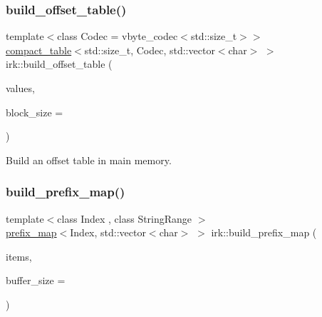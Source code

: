 \mbox{\label{namespaceirk_af80eeaf7666165b73f3c5787bb51e407}} 
\subsubsection{\texorpdfstring{build\+\_\+offset\+\_\+table()}{build\_offset\_table()}}
{\footnotesize\ttfamily template$<$class Codec  = vbyte\+\_\+codec$<$std\+::size\+\_\+t$>$$>$ \\
\mbox{\hyperlink{classirk_1_1compact__table}{compact\+\_\+table}}$<$std\+::size\+\_\+t, Codec, std\+::vector$<$char$>$ $>$ irk\+::build\+\_\+offset\+\_\+table (\begin{DoxyParamCaption}\item[{const std\+::vector$<$ std\+::size\+\_\+t $>$ \&}]{values,  }\item[{std\+::uint32\+\_\+t}]{block\+\_\+size = {} }\end{DoxyParamCaption})}



Build an offset table in main memory. 

\mbox{\label{namespaceirk_a9e498e43015b0fba26ed452bb2981d21}} 
\subsubsection{\texorpdfstring{build\+\_\+prefix\+\_\+map()}{build\_prefix\_map()}}
{\footnotesize\ttfamily template$<$class Index , class String\+Range $>$ \\
\mbox{\hyperlink{classirk_1_1prefix__map}{prefix\+\_\+map}}$<$Index, std\+::vector$<$char$>$ $>$ irk\+::build\+\_\+prefix\+\_\+map (\begin{DoxyParamCaption}\item[{const String\+Range \&}]{items,  }\item[{std\+::size\+\_\+t}]{buffer\+\_\+size = {} }\end{DoxyParamCaption})}

\mbox{\label{namespaceirk_aae903af083f9e6a98e9d5f232322a2f2}} 
